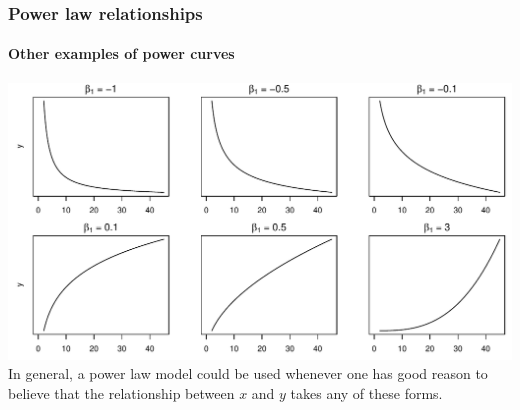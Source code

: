\documentclass{beamer}\usepackage[]{graphicx}\usepackage[]{xcolor}
\makeatletter
\def\maxwidth{ %
  \ifdim\Gin@nat@width>\linewidth
    \linewidth
  \else
    \Gin@nat@width
  \fi
}
\newenvironment{knitrout}{}{} %
\makeatother
\begin{document}


\begin{frame}[fragile]
\frametitle{Power law relationships}
\framesubtitle{Other examples of power curves}
\begin{knitrout}\scriptsize
{}\color{fgcolor}
\includegraphics[width=\maxwidth]{figure/RC-H07-020-1} 
\end{knitrout}
In general, 
a power law model could be used whenever one has good reason to believe that the
relationship between $x$ and $y$ takes any of these forms.
\end{frame}
\end{document}
